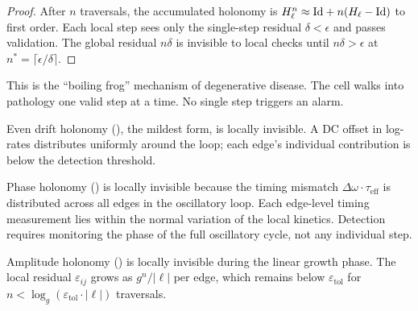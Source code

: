 \begin{proof}
After $n$ traversals, the accumulated holonomy is
$H_\ell^n \approx \mathrm{Id} + n(H_\ell - \mathrm{Id})$ to first order.
Each local step sees only the single-step residual $\delta < \epsilon$
and passes validation.  The global residual $n\delta$ is invisible to
local checks until $n\delta > \epsilon$ at $n^{*} = \lceil\epsilon/\delta\rceil$.
\end{proof}

This is the ``boiling frog'' mechanism of degenerative disease.  The cell
walks into pathology one valid step at a time.  No single step triggers an
alarm.

\begin{corollary}
\label{cor:drift-invisibility}
Even drift holonomy (), the mildest form, is locally
invisible.  A DC offset in log-rates distributes uniformly around the loop;
each edge's individual contribution is below the detection threshold.
\end{corollary}

\begin{corollary}
\label{cor:phase-invisibility}
Phase holonomy () is locally invisible because the
timing mismatch $\Delta\omega \cdot \tau_{\mathrm{eff}}$ is distributed
across all edges in the oscillatory loop.  Each edge-level timing
measurement lies within the normal variation of the local kinetics.
Detection requires monitoring the phase of the full oscillatory cycle,
not any individual step.
\end{corollary}

\begin{corollary}
\label{cor:amp-invisibility}
Amplitude holonomy () is locally invisible during the
linear growth phase.  The local residual $\varepsilon_{ij}$ grows as
$g^n/|\ell|$ per edge, which remains below $\varepsilon_{\mathrm{tol}}$
for $n < \log_g(\varepsilon_{\mathrm{tol}} \cdot |\ell|)$ traversals.
\end{corollary}

